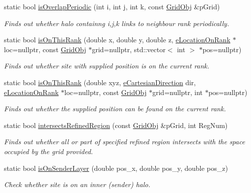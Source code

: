 \begin{DoxyCompactItemize}
static bool \hyperlink{class_grid_utils_a7c13884020ab181ee8cb6dd2ea7e4fd7}{is\+Overlap\+Periodic} (int i, int j, int k, const \hyperlink{class_grid_obj}{Grid\+Obj} \&p\+Grid)
\begin{DoxyCompactList}\small\item\em Finds out whether halo containng i,j,k links to neighbour rank periodically. \end{DoxyCompactList}\item 
static bool \hyperlink{class_grid_utils_a707d0044f6b3376399b972e73c4b1dd7}{is\+On\+This\+Rank} (double x, double y, double z, \hyperlink{_grid_utils_8h_a478f1e2cf9934de79a892e60980598dc}{e\+Location\+On\+Rank} $\ast$loc=nullptr, const \hyperlink{class_grid_obj}{Grid\+Obj} $\ast$grid=nullptr, std\+::vector$<$ int $>$ $\ast$pos=nullptr)
\begin{DoxyCompactList}\small\item\em Finds out whether site with supplied position is on the current rank. \end{DoxyCompactList}\item 
static bool \hyperlink{class_grid_utils_a0e23991df730bfa61749d00484d4ce5f}{is\+On\+This\+Rank} (double xyz, \hyperlink{_grid_utils_8h_afbad8e4a2f1e9903755b1bd2fe8273cf}{e\+Cartesian\+Direction} dir, \hyperlink{_grid_utils_8h_a478f1e2cf9934de79a892e60980598dc}{e\+Location\+On\+Rank} $\ast$loc=nullptr, const \hyperlink{class_grid_obj}{Grid\+Obj} $\ast$grid=nullptr, int $\ast$pos=nullptr)
\begin{DoxyCompactList}\small\item\em Finds out whether the supplied position can be found on the current rank. \end{DoxyCompactList}\item 
static bool \hyperlink{class_grid_utils_a14da5d778eb6d81fbcd5c9331a8082dd}{intersects\+Refined\+Region} (const \hyperlink{class_grid_obj}{Grid\+Obj} \&p\+Grid, int Reg\+Num)
\begin{DoxyCompactList}\small\item\em Finds out whether all or part of specified refined region intersects with the space occupied by the grid provided. \end{DoxyCompactList}\item 
static bool \hyperlink{class_grid_utils_af0692236725709af2d98872805fc84ae}{is\+On\+Sender\+Layer} (double pos\+\_\+x, double pos\+\_\+y, double pos\+\_\+z)
\begin{DoxyCompactList}\small\item\em Check whether site is on an inner (sender) halo. \end{DoxyCompactList}\item 

\end{DoxyCompactItemize}
